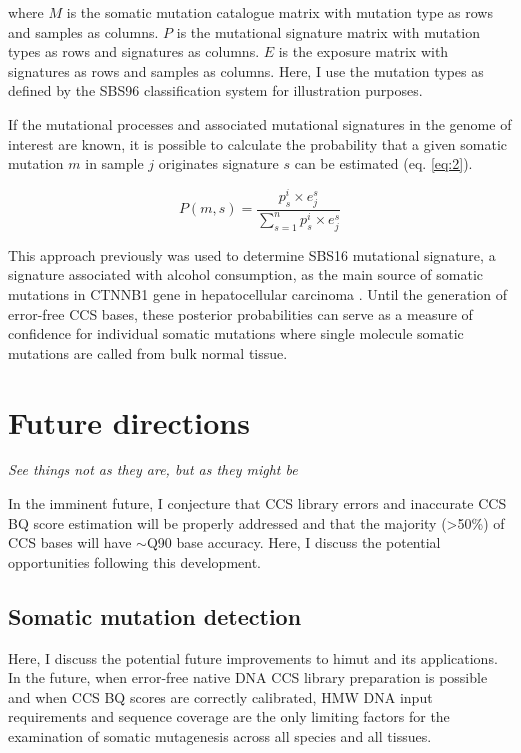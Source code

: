 where $M$ is the somatic mutation catalogue matrix with mutation type as rows and samples as columns. $P$ is the mutational signature matrix with mutation types as rows and signatures as columns. $E$ is the exposure matrix with signatures as rows and samples as columns. Here, I use the mutation types as defined by the SBS96 classification system for illustration purposes.

If the mutational processes and associated mutational signatures in the genome of interest are known, it is possible to calculate the probability that a given somatic mutation $m$ in sample $j$ originates signature $s$ can be estimated (eq. \ref{eq:2}). 

\begin{equation} \label{eq:2} 
P(m,s) = \frac{p^{i}_{s} \times e^{s}_{j}}{\sum^{n}_{s=1}p^{i}_{s} \times e^{s}_{j}}
\end{equation}

This approach previously was used to determine SBS16 mutational signature, a signature associated with alcohol consumption, as the main source of somatic mutations in CTNNB1 gene in hepatocellular carcinoma \cite{Letouze2017-tl}. Until the generation of error-free CCS bases, these posterior probabilities can serve as a measure of confidence for individual somatic mutations where single molecule somatic mutations are called from bulk normal tissue. 

\section{Future directions}

\textit{See things not as they are, but as they might be}
\begin{flushright}  \end{flushright} 

In the imminent future, I conjecture that CCS library errors and inaccurate CCS BQ score estimation will be properly addressed and that the majority (>50\%) of CCS bases will have $\sim$Q90 base accuracy. Here, I discuss the potential opportunities following this development.

\subsection{Somatic mutation detection}

Here, I discuss the potential future improvements to himut and its applications. In the future, when error-free native DNA CCS library preparation is possible and when CCS BQ scores are correctly calibrated, HMW DNA input requirements and sequence coverage are the only limiting factors for the examination of somatic mutagenesis across all species and all tissues. 

